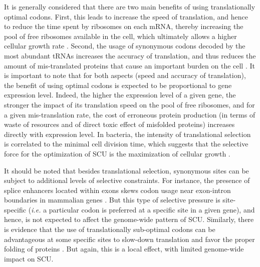 It is generally considered that there are two main benefits of using translationally optimal codons. First, this leads to increase the speed of translation, and hence to reduce the time spent by ribosomes on each mRNA, thereby increasing the pool of free ribosomes available in the cell, which ultimately allows a higher cellular growth rate \citep{bulmer_selection-mutation-drift_1991}. Second, the usage of synonymous codons decoded by the most abundant tRNAs increases the accuracy of translation, and thus reduces the amount of mis-translated proteins that cause an important burden on the cell \citep{akashi_synonymous_1994, drummond_single_2006}. It is important to note that for both aspects (speed and accuracy of translation), the benefit of using optimal codons is expected to be proportional to gene expression level. Indeed, the higher the expression level of a given gene, the stronger the impact of its translation speed on the pool of free ribosomes, and for a given mis-translation rate, the cost of erroneous protein production (in terms of waste of resources and of direct toxic effect of misfolded proteins) increases directly with expression level. In bacteria, the intensity of translational selection is correlated to the minimal cell division time, which suggests that the selective force for the optimization of SCU is the maximization of cellular growth \citep{rocha_codon_2004, sharp_variation_2005}.

It should be noted that besides translational selection, synonymous sites can be subject to additional levels of selective constraints. For instance, the presence of splice enhancers located within exons skews codon usage near exon-intron boundaries in mammalian genes \citep{parmley_exonic_2007}. But this type of selective pressure is site-specific (\textit{i.e.} a particular codon is preferred at a specific site in a given gene), and hence, is not expected to affect the genome-wide pattern of SCU. Similarly, there is evidence that the use of translationally sub-optimal codons can be advantageous at some specific sites to slow-down translation and favor the proper folding of proteins \citep{buhr_synonymous_2016, walsh_synonymous_2020}. But again, this is a local effect, with limited genome-wide impact on SCU.

